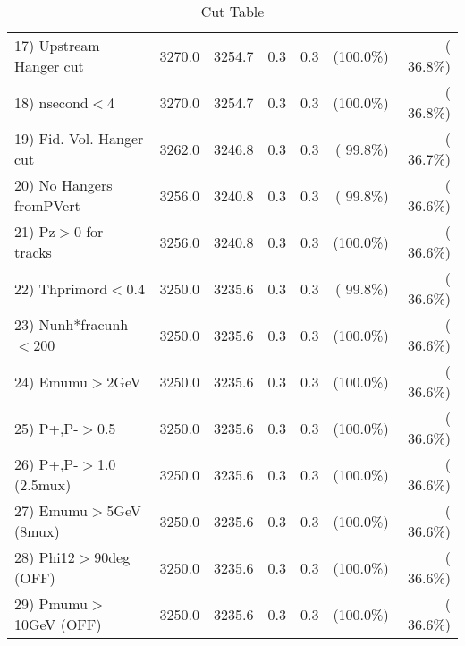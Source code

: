 \begin{table}[h!]
\begin{tabular}{||l||r|r|r|r|r|r||}
 17) Upstream Hanger cut  &       3270.0 &       3254.7 &          0.3 &          0.3 & (100.0\%) & ( 36.8\%) \\
 18) nsecond$<$4          &       3270.0 &       3254.7 &          0.3 &          0.3 & (100.0\%) & ( 36.8\%) \\
 19) Fid. Vol. Hanger cut &       3262.0 &       3246.8 &          0.3 &          0.3 & ( 99.8\%) & ( 36.7\%) \\
 20) No Hangers fromPVert &       3256.0 &       3240.8 &          0.3 &          0.3 & ( 99.8\%) & ( 36.6\%) \\
 21) Pz$>$0 for tracks    &       3256.0 &       3240.8 &          0.3 &          0.3 & (100.0\%) & ( 36.6\%) \\
 22) Thprimord$<$0.4      &       3250.0 &       3235.6 &          0.3 &          0.3 & ( 99.8\%) & ( 36.6\%) \\
 23) Nunh*fracunh$<$200   &       3250.0 &       3235.6 &          0.3 &          0.3 & (100.0\%) & ( 36.6\%) \\
 24) Emumu$>$2GeV         &       3250.0 &       3235.6 &          0.3 &          0.3 & (100.0\%) & ( 36.6\%) \\
 25) P+,P-$>$0.5          &       3250.0 &       3235.6 &          0.3 &          0.3 & (100.0\%) & ( 36.6\%) \\
 26) P+,P-$>$1.0 (2.5mux) &       3250.0 &       3235.6 &          0.3 &          0.3 & (100.0\%) & ( 36.6\%) \\
 27) Emumu$>$5GeV  (8mux) &       3250.0 &       3235.6 &          0.3 &          0.3 & (100.0\%) & ( 36.6\%) \\
 28) Phi12$>$90deg  (OFF) &       3250.0 &       3235.6 &          0.3 &          0.3 & (100.0\%) & ( 36.6\%) \\
 29) Pmumu$>$10GeV  (OFF) &       3250.0 &       3235.6 &          0.3 &          0.3 & (100.0\%) & ( 36.6\%) \\
 \hline
 \hline
 \end{tabular}
 \caption{Cut Table           }
 \label{tab-cutcohjpsi-mumu_jpsi}
 \end{table}
